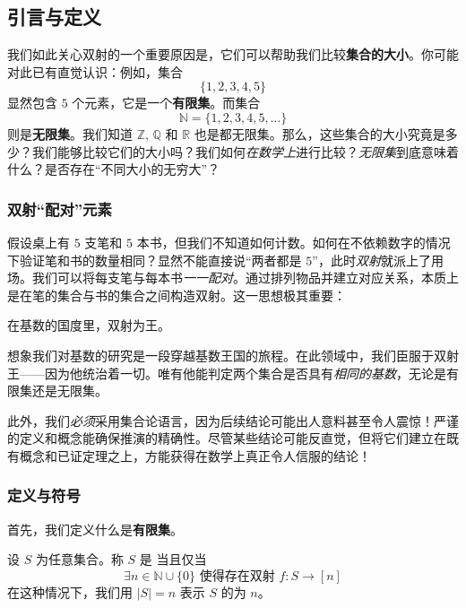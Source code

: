 
\subsection{引言与定义}

我们如此关心双射的一个重要原因是，它们可以帮助我们比较\textbf{集合的大小}。你可能对此已有直觉认识：例如，集合
\[\{1, 2, 3, 4, 5\}\]
显然包含 $5$ 个元素，它是一个\textbf{有限集}。而集合
\[\mathbb{N} = \{1, 2, 3, 4, 5, \dots \}\]
则是\textbf{无限集}。我们知道 $\mathbb{Z}$, $\mathbb{Q}$ 和 $\mathbb{R}$ 也是都无限集。那么，这些集合的大小究竟是多少？我们能够比较它们的大小吗？我们如何\emph{在数学上}进行比较？\emph{无限集}到底意味着什么？是否存在``不同大小的无穷大''？

\subsubsection*{双射``配对''元素}

假设桌上有 $5$ 支笔和 $5$ 本书，但我们不知道如何计数。如何在不依赖数字的情况下验证笔和书的数量相同？显然不能直接说``两者都是 $5$''，此时\emph{双射}就派上了用场。我们可以将每支笔与每本书\emph{一一配对}。通过排列物品并建立对应关系，本质上是在笔的集合与书的集合之间构造双射。这一思想极其重要：
\begin{center}
    \large{在基数的国度里，双射为王。}
\end{center}

想象我们对基数的研究是一段穿越基数王国的旅程。在此领域中，我们臣服于双射王——因为他统治着一切。唯有他能判定两个集合是否具有\emph{相同的基数}，无论是有限集还是无限集。

此外，我们\emph{必须}采用集合论语言，因为后续结论可能出人意料甚至令人震惊！严谨的定义和概念能确保推演的精确性。尽管某些结论可能反直觉，但将它们建立在既有概念和已证定理之上，方能获得在数学上真正令人信服的结论！

\clearpage

\subsubsection*{定义与符号}

首先，我们定义什么是\textbf{有限集}。

\begin{definition}
    设 $S$ 为任意集合。称 $S$ 是 当且仅当
    \[\exists n \in \mathbb{N} \cup \{0\} \text{\ 使得存在双射\ } f : S \to [n]\]
    在这种情况下，我们用 $|S| = n$ 表示 $S$ 的为 $n$。
\end{definition}

